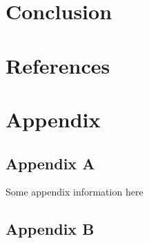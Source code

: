 \documentclass[11pt,preprint, authoryear]{elsarticle}
\numberwithin{equation}{section}
\numberwithin{figure}{section}
\numberwithin{table}{section}
\newlength{\cslhangindent}
\newenvironment{CSLReferences}%
  {\setlength{\parindent}{0pt}%
  \everypar{\setlength{\hangindent}{\cslhangindent}}\ignorespaces}%
  {\par}
\begin{document}
\hfill

\hypertarget{conclusion-1}{%
\section{Conclusion}\label{conclusion-1}}

\newpage

\hypertarget{references}{%
\section*{References}\label{references}}

\hypertarget{refs}{}
\begin{CSLReferences}{0}{0}
\end{CSLReferences}

\hypertarget{appendix}{%
\section*{Appendix}\label{appendix}}

\hypertarget{appendix-a}{%
\subsection*{Appendix A}\label{appendix-a}}

Some appendix information here

\hypertarget{appendix-b}{%
\subsection*{Appendix B}\label{appendix-b}}


\end{document}
